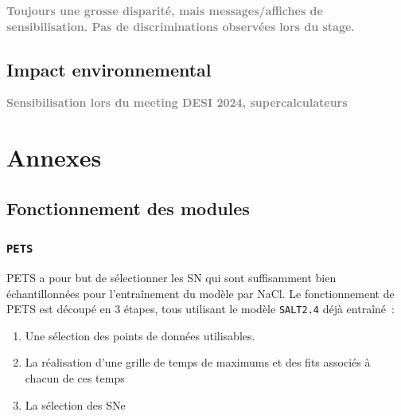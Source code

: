 \documentclass{book}
\newcommand{\todo}[1]{{\textcolor{gray}{\bf \large #1}}}
\def\pets{\texttt{PETS}\xspace}
\def\saltd{\texttt{SALT2.4}\xspace}
\begin{document}
\todo{Toujours une grosse disparité, mais messages/affiches de sensibilisation. Pas de discriminations observées lors du stage.}

\section{Impact environnemental}

\todo{Sensibilisation lors du meeting DESI 2024, supercalculateurs}





\appendix
\chapter{Annexes}

\section{Fonctionnement des modules}

\subsection{\pets}
\label{anx:pets}

PETS a pour but de sélectionner les SN qui sont suffisamment bien échantillonnées pour l'entraînement du modèle par NaCl.
Le fonctionnement de PETS est découpé en 3 étapes, tous utilisant le modèle \saltd déjà entraîné~:
\begin{enumerate}
\item Une sélection des points de données utilisables.
\item La réalisation d'une grille de temps de maximums et des fits associés à chacun de ces temps
\item La sélection des SNe
\end{enumerate}
\end{document}
